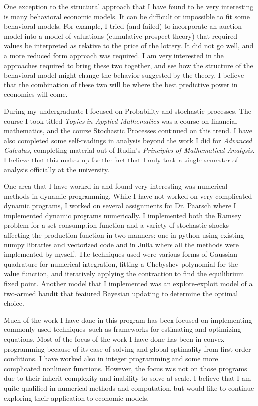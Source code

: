 \documentclass[10pt, a4paper]{article}
\begin{document}
One exception to the structural approach that I have found to be very
interesting is many behavioral economic models. It can be difficult or
impossible to fit some behavioral models. For example, I tried (and
failed) to incorporate an auction model into a model of valuations
(cumulative prospect theory) that required values be interpreted as
relative to the price of the lottery. It did not go well, and a more
reduced form approach was required. I am very interested in the
approaches required to bring these two together, and see how the
structure of the behavioral model might change the behavior suggested
by the theory. I believe that the combination of these two will be
where the best predictive power in economics will come.

During my undergraduate I focused on Probability and stochastic
processes. The course I took titled \emph{Topics in Applied Mathematics}
was a course on financial mathematics, and the course Stochastic
Processes continued on this trend. I have also completed some
self-readings in analysis beyond the work I did for \emph{Advanced
Calculus}, completing material out of Rudin's \emph{Principles of
Mathematical Analysis}. I believe that this makes up for the fact that
I only took a single semester of analysis officially at the
university. 

One area that I have worked in and found very interesting was
numerical methods in dynamic programming. While I have not worked on
very complicated dynamic programs, I worked on several assignments for
Dr. Paarsch where I implemented dynamic programs numerically. I
implemented both the Ramsey problem for a set consumption function
and a variety of stochastic shocks affecting the production function
in two manners: one in python using existing numpy libraries and
vectorized code and in Julia where all the methods were implemented by
myself. The techniques used were various forms of Gaussian quadrature
for numerical integration, fitting a Chebyshev polynomial for the
value function, and iteratively applying the contraction to find the
equilibrium fixed point. Another model that I implemented was an
explore-exploit model of a two-armed bandit that featured Bayesian
updating to determine the optimal choice.

Much of the work I have done in this program has been focused on
implementing commonly used techniques, such as frameworks for
estimating and optimizing equations. Most of the focus of the work I
have done has been in convex programming because of its ease of
solving and global optimality from first-order conditions. I have
worked also in integer programming and some more complicated nonlinear
functions. However, the focus was not on those programs due to their
inherit complexity and inability to solve at scale. I believe that I
am quite qualified in numerical methods and computation, but would
like to continue exploring their application to economic models.
\end{document}
